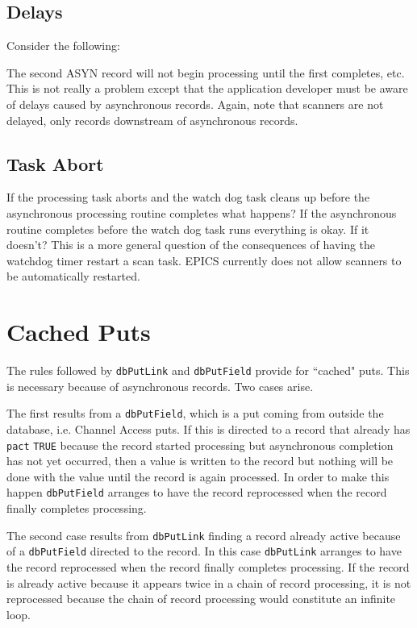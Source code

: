 \subsection{Delays}

Consider the following:

The second ASYN record will not begin processing until the first completes, etc. This is not really a problem except that 
the application developer must be aware of delays caused by asynchronous records. Again, note that scanners are not 
delayed, only records downstream of asynchronous records. 

\subsection{Task Abort}

If the processing task aborts and the watch dog task cleans up before the asynchronous processing routine completes what 
happens? If the asynchronous routine completes before the watch dog task runs everything is okay. If it doesn't? This is a 
more general question of the consequences of having the watchdog timer restart a scan task. EPICS currently does not 
allow scanners to be automatically restarted. 

\section{Cached Puts}

The rules followed by \verb|dbPutLink| and \verb|dbPutField| provide for ``cached" puts. This is necessary because of 
asynchronous records. Two cases arise.

The first results from a \verb|dbPutField|, which is a put coming from outside the database, i.e. Channel Access puts. If this 
is directed to a record that already has \verb|pact| \verb|TRUE| because the record started processing but asynchronous completion 
has not yet occurred, then a value is written to the record but nothing will be done with the value until the record is again 
processed. In order to make this happen \verb|dbPutField| arranges to have the record reprocessed when the record finally 
completes processing.

The second case results from \verb|dbPutLink| finding a record already active because of a \verb|dbPutField| directed to the 
record. In this case \verb|dbPutLink| arranges to have the record reprocessed when the record finally completes processing. If 
the record is already active because it appears twice in a chain of record processing, it is not reprocessed because the chain 
of record processing would constitute an infinite loop.

